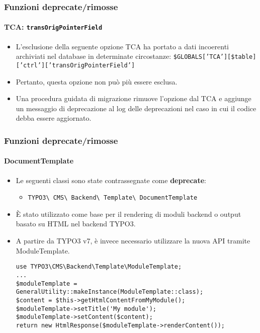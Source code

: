 \begin{frame}[fragile]
	\frametitle{Funzioni deprecate/rimosse}
	\framesubtitle{TCA: \texttt{transOrigPointerField}}

	\begin{itemize}
		\item L'esclusione della seguente opzione TCA ha portato a dati incoerenti archiviati nel database in determinate circostanze:
			\small
				\texttt{\$GLOBALS['TCA'][\$table]['ctrl']['transOrigPointerField']}
			\normalsize

		\item Pertanto, questa opzione non può più essere esclusa.
		\item Una procedura guidata di migrazione rimuove l'opzione dal TCA e aggiunge un messaggio di deprecazione al log
		    delle deprecazioni nel caso in cui il codice debba essere aggiornato.
	\end{itemize}

\end{frame}


\begin{frame}[fragile]
	\frametitle{Funzioni deprecate/rimosse}
	\framesubtitle{DocumentTemplate}

	\lstset{basicstyle=\tiny\ttfamily}

	\begin{itemize}
		\item Le seguenti classi sono state contrassegnate come \textbf{deprecate}:

			\begin{itemize}
				\item \texttt{TYPO3\textbackslash
					CMS\textbackslash
					Backend\textbackslash
					Template\textbackslash
					DocumentTemplate}
			\end{itemize}

		\item È stato utilizzato come base per il rendering di moduli backend o output basato su HTML nel backend TYPO3.
		\item A partire da TYPO3 v7, è invece necessario utilizzare la nuova API tramite ModuleTemplate.

\vspace{-0.4cm}
\begin{lstlisting}
use TYPO3\CMS\Backend\Template\ModuleTemplate;
...
$moduleTemplate = GeneralUtility::makeInstance(ModuleTemplate::class);
$content = $this->getHtmlContentFromMyModule();
$moduleTemplate->setTitle('My module');
$moduleTemplate->setContent($content);
return new HtmlResponse($moduleTemplate->renderContent());
\end{lstlisting}

	\end{itemize}

\end{frame}

